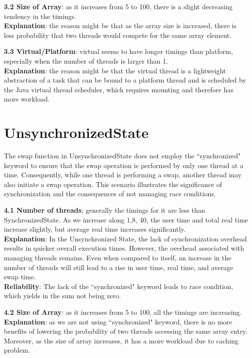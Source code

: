 \documentclass[letterpaper,twocolumn,10pt]{article}
\begin{document}
\noindent\textbf{3.2 Size of Array}: as it increases from 5 to 100,
there is a slight decreasing tendency in the timings.\\
\textbf{Explanation}: the reason might be that as the array size
is increased, there is less probability that two threads would
compete for the same array element.

\noindent\textbf{3.3 Virtual/Platform}: virtual seems to have
longer timings than platform, especially when the number of
threads is larger than 1.\\
\textbf{Explanation}: the reason might be that the virtual thread
is a lightweight abstraction of a task that can be bound to a 
platform thread and is scheduled by the Java virtual thread 
scheduler, which requires mounting and therefore has more workload.

\section{UnsynchronizedState}

The swap function in UnsynchronizedState does not employ
the ``synchronized" keyword to ensure that the swap operation
is performed by only one thread at a time. Consequently, while
one thread is performing a swap, another thread may also
initiate a swap operation. This scenario illustrates the
significance of synchronization and the consequences of not
managing race conditions.

\noindent\textbf{4.1 Number of threads}: generally the timings
for it are less than SynchronizedState. As we increase along
1,8, 40, the user time and total real time increase slightly, but
average real time increases significantly.\\
\textbf{Explanation}: In the Unsynchronized State, the lack of
synchronization overhead results in quicker overall execution
times. However, the overhead associated with managing
threads remains. Even when compared to itself, an increase
in the number of threads will still lead to a rise in user time,
real time, and average swap time.\\
\textbf{Reliability}: The lack of the ``synchronized" keyword
leads to race condition, which yields in the sum not being zero.

\noindent\textbf{4.2 Size of Array}: as it increases from 5 to 100,
all the timings are increasing.\\
\textbf{Explanation}: as we are not using ``synchronized" keyword,
there is no more benefits of lowering the probability of two threads
accessing the same array entry. Moreover, as the size of array
increases, it has a more workload due to caching problem.
\end{document}
